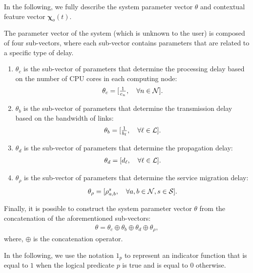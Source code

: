 In the following, we fully describe the system parameter vector
$\theta$ and contextual feature vector $\pmb{\chi}_{o}(t)$.

The parameter vector of the system (which is unknown to the user) is composed of four sub-vectors, where each sub-vector contains parameters that are related to a specific type of delay.
\begin{enumerate}[leftmargin=*]
	\item $\theta_{c}$ is the sub-vector of parameters that determine the processing delay based on the number of CPU cores in each computing node:
	\begin{gather}
		\theta_{c} = [\textstyle\frac{1}{c_{n}}, \quad \forall n\in\mathcal{N}]. 
	\end{gather}
	\item $\theta_{b}$ is the sub-vector of parameters that determine the transmission delay based on the bandwidth of links:
	\begin{gather}
		\theta_{b} = [\textstyle\frac{1}{b_{\ell}}, \quad \forall \ell\in\mathcal{L}].
	\end{gather}
	\item $\theta_{d}$ is the sub-vector of parameters that determine the propagation delay:
	\begin{gather}
		\theta_{d} = [d_{\ell}, \quad \forall \ell\in\mathcal{L}].
	\end{gather}
	\item $\theta_{\rho}$ is the sub-vector of parameters that determine the service migration delay:
	\begin{gather}
		\theta_{\rho} = [\rho_{a,b}^{s}, \quad \forall a,b\in\mathcal{N}, s\in\mathcal{S}].
	\end{gather}
\end{enumerate}
Finally, it is possible to construct the system parameter vector $\theta$ from the concatenation of the aforementioned sub-vectors:
\begin{gather}
	\theta = \theta_{c} \oplus \theta_{b} \oplus \theta_{d} \oplus \theta_{\rho},
\end{gather}
where, $\oplus$ is the concatenation operator.


In the following, we use the notation $1_p$ to represent an indicator function that is equal to $1$ when the logical predicate $p$ is true and is equal to $0$ otherwise. 

